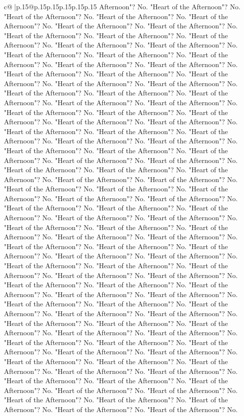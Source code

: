 \documentclass{article}
\begin{document}
{\begin{supertabular}{c@{$\;$}|p{.15\linewidth}@{}p{.15\linewidth}p{.15\linewidth}p{.15\linewidth}p{.15\linewidth}p{.15\linewidth}}
{{{Afternoon"? No. "Heart of the Afternoon"? No. "Heart of the Afternoon"? No. "Heart of the Afternoon"? No. "Heart of the Afternoon"? No. "Heart of the Afternoon"? No. "Heart of the Afternoon"? No. "Heart of the Afternoon"? No. "Heart of the Afternoon"? No. "Heart of the Afternoon"? No. "Heart of the Afternoon"? No. "Heart of the Afternoon"? No. "Heart of the Afternoon"? No. "Heart of the Afternoon"? No. "Heart of the Afternoon"? No. "Heart of the Afternoon"? No. "Heart of the Afternoon"? No. "Heart of the Afternoon"? No. "Heart of the Afternoon"? No. "Heart of the Afternoon"? No. "Heart of the Afternoon"? No. "Heart of the Afternoon"? No. "Heart of the Afternoon"? No. "Heart of the Afternoon"? No. "Heart of the Afternoon"? No. "Heart of the Afternoon"? No. "Heart of the Afternoon"? No. "Heart of the Afternoon"? No. "Heart of the Afternoon"? No. "Heart of the Afternoon"? No. "Heart of the Afternoon"? No. "Heart of the Afternoon"? No. "Heart of the Afternoon"? No. "Heart of the Afternoon"? No. "Heart of the Afternoon"? No. "Heart of the Afternoon"? No. "Heart of the Afternoon"? No. "Heart of the Afternoon"? No. "Heart of the Afternoon"? No. "Heart of the Afternoon"? No. "Heart of the Afternoon"? No. "Heart of the Afternoon"? No. "Heart of the Afternoon"? No. "Heart of the Afternoon"? No. "Heart of the Afternoon"? No. "Heart of the Afternoon"? No. "Heart of the Afternoon"? No. "Heart of the Afternoon"? No. "Heart of the Afternoon"? No. "Heart of the Afternoon"? No. "Heart of the Afternoon"? No. "Heart of the Afternoon"? No. "Heart of the Afternoon"? No. "Heart of the Afternoon"? No. "Heart of the Afternoon"? No. "Heart of the Afternoon"? No. "Heart of the Afternoon"? No. "Heart of the Afternoon"? No. "Heart of the Afternoon"? No. "Heart of the Afternoon"? No. "Heart of the Afternoon"? No. "Heart of the Afternoon"? No. "Heart of the Afternoon"? No. "Heart of the Afternoon"? No. "Heart of the Afternoon"? No. "Heart of the Afternoon"? No. "Heart of the Afternoon"? No. "Heart of the Afternoon"? No. "Heart of the Afternoon"? No. "Heart of the Afternoon"? No. "Heart of the Afternoon"? No. "Heart of the Afternoon"? No. "Heart of the Afternoon"? No. "Heart of the Afternoon"? No. "Heart of the Afternoon"? No. "Heart of the Afternoon"? No. "Heart of the Afternoon"? No. "Heart of the Afternoon"? No. "Heart of the Afternoon"? No. "Heart of the Afternoon"? No. "Heart of the Afternoon"? No. "Heart of the Afternoon"? No. "Heart of the Afternoon"? No. "Heart of the Afternoon"? No. "Heart of the Afternoon"? No. "Heart of the Afternoon"? No. "Heart of the Afternoon"? No. "Heart of the Afternoon"? No. "Heart of the Afternoon"? No. "Heart of the Afternoon"? No. "Heart of the Afternoon"? No. "Heart of the Afternoon"? No. "Heart of the Afternoon"? No. "Heart of the Afternoon"? No. "Heart of the Afternoon"? No. "Heart of the Afternoon"? No. "Heart of the Afternoon"? No. "Heart of the Afternoon"? No. "Heart of the Afternoon"? No. "Heart of the Afternoon"? No. "Heart of the Afternoon"? No. "Heart of the Afternoon"? No. "Heart of the Afternoon"? No. "Heart of the Afternoon"? No. "Heart of the Afternoon"? No. "Heart of the Afternoon"? No. "Heart of the Afternoon"? No. }}}
\end{supertabular}}
\end{document}
